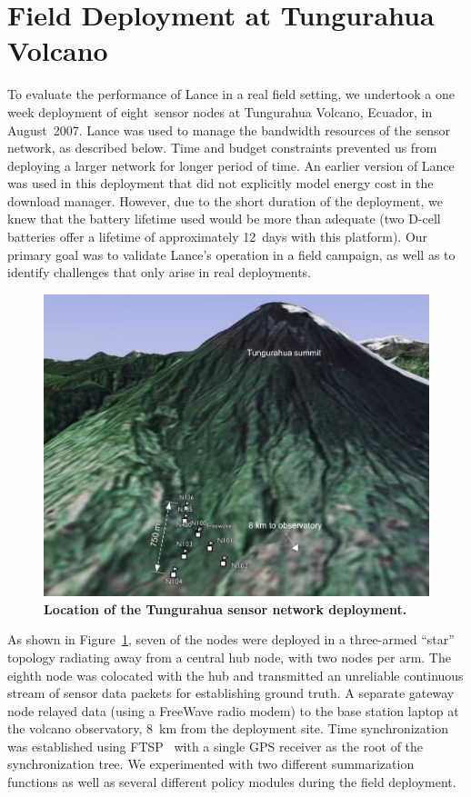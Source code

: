 \section{Field Deployment at Tungurahua Volcano}
\label{lance-sec-deployment}

To evaluate the performance of Lance in a real field setting, we undertook a
one week deployment of eight~sensor nodes at Tungurahua Volcano, Ecuador, in
August~2007. Lance was used to manage the bandwidth resources of the sensor
network, as described below. Time and budget constraints prevented us from
deploying a larger network for longer period of time. An earlier version of
Lance was used in this deployment that did not explicitly model energy cost
in the download manager. However, due to the short duration of the
deployment, we knew that the battery lifetime used would be more than
adequate (two D-cell batteries offer a lifetime of approximately 12~days with
this platform). Our primary goal was to validate Lance's operation in a field
campaign, as well as to identify challenges that only arise in real
deployments.

\begin{figure}[t]
\begin{center}
\includegraphics[width=0.7\hsize]{./4-lance/figs/map.pdf}
\end{center}

\caption{\textbf{Location of the Tungurahua sensor network deployment.}}

\label{lance-fig-map}
\end{figure}

As shown in Figure~\ref{lance-fig-map}, seven of the nodes were deployed in a
three-armed ``star'' topology radiating away from a central hub node, with
two nodes per arm. The eighth node was colocated with the hub and transmitted
an unreliable continuous stream of sensor data packets for establishing
ground truth. A separate gateway node relayed data (using a FreeWave radio
modem) to the base station laptop at the volcano observatory, 8~km from the
deployment site. Time synchronization was established using FTSP~\cite{ftsp}
with a single GPS receiver as the root of the synchronization tree. We
experimented with two different summarization functions as well as several
different policy modules during the field deployment.

